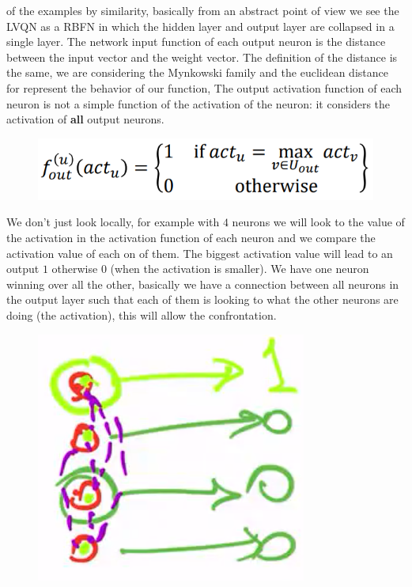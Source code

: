 \documentclass{article}
\begin{document}
of the examples by similarity, basically from an abstract point of view we see the LVQN as a RBFN in which the hidden layer and output layer are collapsed in a single layer.
\newline\newline
The network input function of each output neuron is the distance between the input vector and the
weight vector. The definition of the distance is the same, we are considering the Mynkowski family
and the euclidean distance for represent the behavior of our function,
\newline\newline
The output activation function of each neuron is not a simple function of the activation of the
neuron: it considers the activation of \textbf{all} output neurons.
\begin{figure}[H]
    \centering
    \includegraphics[scale=0.4]{images/act_lvqnn.png}
\end{figure}
We don't just look locally, for example with $4$ neurons we will look to the value of the activation
in the activation function of each neuron and we compare the activation value of each on of them. The
biggest activation value will lead to an output $1$ otherwise $0$ (when the activation is smaller). We
have one neuron winning over all the other, basically we have a connection between all neurons in the
output layer such that each of them is looking to what the other neurons are doing (the activation),
this will allow the confrontation.
\begin{figure}[H]
    \centering
    \includegraphics[scale=0.6]{images/lvqq_neur_confront.png}
\end{figure}
\end{document}
